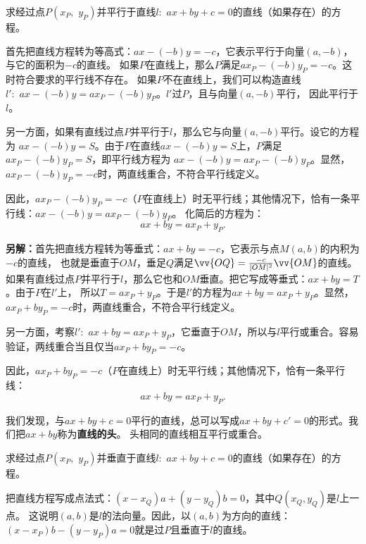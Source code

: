 \documentclass[12pt,UTF8,fontset=none]{ctexbook}
\begin{document}
\begin{ex}
    求经过点$P(x_P, \,\,y_P)$并平行于直线$l: \,\, ax + by + c = 0$的直线（如果存在）的方程。
\end{ex}
\begin{so}
首先把直线方程转为等高式：$ax - (-b)y = -c$，它表示平行于向量$(a, -b)$，与它的面积为$-c$的直线。
如果$P$在直线上，那么$P$满足$ax_P - (-b)y_P = -c$。这时符合要求的平行线不存在。
如果$P$不在直线上，我们可以构造直线$l' : \,\, ax - (-b)y = ax_P - (-b)y_P$。$l'$过$P$，且与向量$(a, -b)$平行，
因此平行于$l$。

另一方面，如果有直线过点$P$并平行于$l$，那么它与向量$(a, -b)$平行。设它的方程为
$ax - (-b)y = S$。由于$P$在直线$ax - (-b)y = S$上，$P$满足$ax_P - (-b)y_P = S$，即平行线方程为
$ax - (-b)y = ax_P - (-b)y_P$。显然，$ax_P - (-b)y_P = -c$时，两直线重合，不符合平行线定义。

因此，$ax_P - (-b)y_P = -c$（$P$在直线上）时无平行线；其他情况下，恰有一条平行线：$ax - (-b)y = ax_P - (-b)y_P$。
化简后的方程为：
$$ax + by = ax_P + y_P.$$

\textbf{另解：}首先把直线方程转为等垂式：$ax + by = -c$，它表示与点$M(a, b)$的内积为$-c$的直线，
也就是垂直于$OM$，垂足$Q$满足$\vv{OQ} = \frac{-c}{|OM|^2}\vv{OM}$的直线。
如果有直线过点$P$并平行于$l$，那么它也和$OM$垂直。把它写成等垂式：$ax + by = T$。由于$P$在$l'$上，
所以$T = ax_P + y_P$。于是$l'$的方程为$ax + by = ax_P + y_P$。显然，$ax_P + by_P = -c$时，两直线重合，不符合平行线定义。

另一方面，考察$l' : \,\, ax + by = ax_P + y_P$，它垂直于$OM$，所以与$l$平行或重合。容易验证，两线重合当且仅当$ax_P + by_P = -c$。

因此，$ax_P + by_P = -c$（$P$在直线上）时无平行线；其他情况下，恰有一条平行线：
$$ax + by = ax_P + y_P.$$

我们发现，与$ax + by + c = 0$平行的直线，总可以写成$ax + by + c' = 0$的形式。我们把$ax + by$称为\textbf{直线的头}。
头相同的直线相互平行或重合。
\end{so}

\begin{et}
    求经过点$P(x_P, \,\,y_P)$并垂直于直线$l: \,\, ax + by + c = 0$的直线（如果存在）的方程。
\end{et}
\begin{so}
    把直线方程写成点法式：$(x - x_Q)a + (y - y_Q)b = 0$，其中$Q(x_Q, y_Q)$是$l$上一点。
这说明$(a, b)$是$l$的法向量。因此，以$(a, b)$为方向的直线：$(x - x_P)b - (y - y_P)a = 0$就是过$P$且垂直于$l$的直线。
\end{so}
\end{document}
